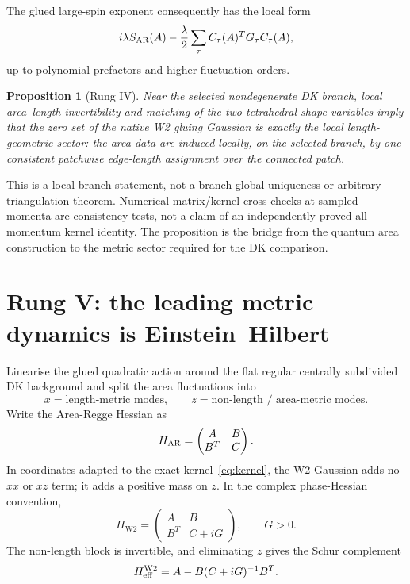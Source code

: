 \documentclass[11pt]{article}
\numberwithin{equation}{section}
\newtheorem{proposition}[theorem]{Proposition}
\newcommand{\Wtwo}{\mathrm{W2}}
\begin{document}
The glued large-spin exponent consequently has the local form
\begin{equation}\label{eq:gluedaction}
  i\lambda S_{\rm AR}(A)
  -\frac{\lambda}{2}\sum_\tau C_\tau(A)^TG_\tau C_\tau(A),
\end{equation}
up to polynomial prefactors and higher fluctuation orders.

\begin{proposition}[Rung IV]
Near the selected nondegenerate DK branch, local area--length invertibility and matching of the two tetrahedral shape variables imply that the zero set of the native W2 gluing Gaussian is exactly the local length-geometric sector: the area data are induced locally, on the selected branch, by one consistent patchwise edge-length assignment over the connected patch.
\end{proposition}

This is a local-branch statement, not a branch-global uniqueness or arbitrary-triangulation theorem. Numerical matrix/kernel cross-checks at sampled momenta are consistency tests, not a claim of an independently proved all-momentum kernel identity. The proposition is the bridge from the quantum area construction to the metric sector required for the DK comparison.

\section{Rung V: the leading metric dynamics is Einstein--Hilbert}\label{sec:r5}

Linearise the glued quadratic action around the flat regular centrally subdivided DK background and split the area fluctuations into
\begin{equation}
  x=\text{length-metric modes},\qquad
  z=\text{non-length / area-metric modes}.
\end{equation}
Write the Area-Regge Hessian as
\begin{equation}
  H_{\rm AR}=\begin{pmatrix}A&B\\ B^T&C\end{pmatrix}.
\end{equation}
In coordinates adapted to the exact kernel~\eqref{eq:kernel}, the W2 Gaussian adds no $xx$ or $xz$ term; it adds a positive mass on $z$. In the complex phase-Hessian convention,
\begin{equation}
  H_{\Wtwo}=\begin{pmatrix}A&B\\B^T&C+iG\end{pmatrix},\qquad G>0.
\end{equation}
The non-length block is invertible, and eliminating $z$ gives the Schur complement
\begin{equation}\label{eq:schur}
  H_{\rm eff}^{\Wtwo}
  =A-B(C+iG)^{-1}B^T.
\end{equation}
\end{document}
